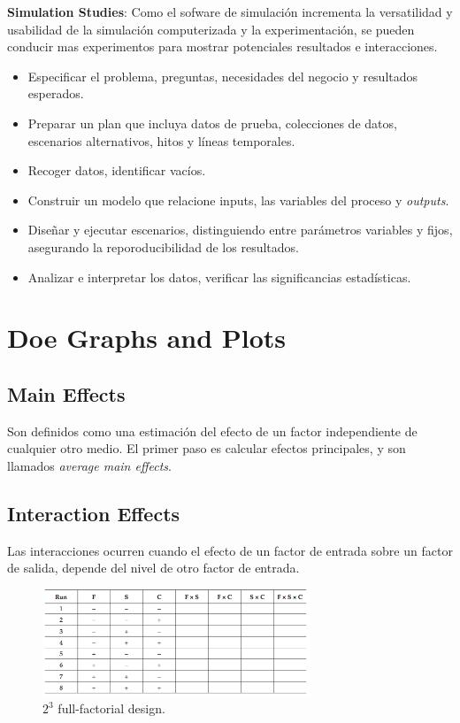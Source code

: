 \documentclass[oneside]{book}
\begin{document}
\textbf{Simulation Studies}: Como el sofware de simulación incrementa la versatilidad y usabilidad de la simulación computerizada y la experimentación, se pueden conducir mas experimentos para mostrar potenciales resultados e interacciones. 

\begin{itemize}
	\item Especificar el problema, preguntas, necesidades del negocio y resultados esperados.
	\item Preparar un plan que incluya datos de prueba, colecciones de datos, escenarios alternativos, hitos y líneas temporales.
	\item Recoger datos, identificar vacíos.
	\item Construir un modelo que relacione inputs, las variables del proceso y \textit{outputs}.
	\item Diseñar y ejecutar escenarios, distinguiendo entre parámetros variables y fijos, asegurando la reporoducibilidad de los resultados.
	\item Analizar e interpretar los datos, verificar las significancias estadísticas.
\end{itemize}

\section{Doe Graphs and Plots}
\subsection{Main Effects}
Son definidos como una estimación del efecto de un factor independiente de cualquier otro medio. El primer paso es calcular efectos principales, y son llamados \textit{average main effects}.

\subsection{Interaction Effects}
Las interacciones ocurren cuando el efecto de un factor de entrada sobre un factor de salida, depende del nivel de otro factor de entrada.

\begin{figure}[H]
	\centering
	\includegraphics[width=80mm]{imagenes/a23design.png}
	\caption{$2^3$ full-factorial design.}
	\label{fig:A23design}
\end{figure}
\end{document}
